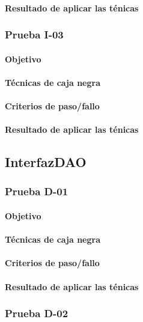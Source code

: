 \documentclass[10pt,a4paper]{article}
\begin{document}
			\paragraph{Resultado de aplicar las ténicas}
			\subsubsection{Prueba I-03}
			\paragraph{Objetivo}
			\paragraph{Técnicas de caja negra}
			\paragraph{Criterios de paso/fallo}
			\paragraph{Resultado de aplicar las ténicas}
	\subsection{InterfazDAO}
			\subsubsection{Prueba D-01}
			\paragraph{Objetivo}
			\paragraph{Técnicas de caja negra}
			\paragraph{Criterios de paso/fallo}
			\paragraph{Resultado de aplicar las ténicas}
			\subsubsection{Prueba D-02}
\end{document}
